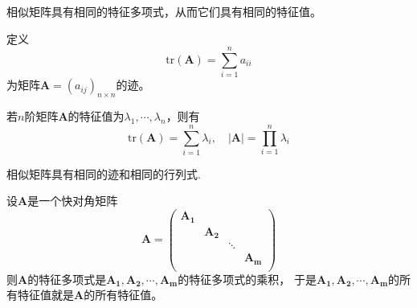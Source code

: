 \begin{theorem}
    相似矩阵具有相同的特征多项式，从而它们具有相同的特征值。
\end{theorem}

\begin{definition}[迹]
    定义$$\mathrm{tr}(\boldsymbol{A})=\sum_{i=1}^n a_{ii}$$
    为矩阵$\boldsymbol{A}=(a_{ij})_{n\times n}$的迹。
\end{definition}

\begin{theorem}
    若$n$阶矩阵$\boldsymbol{A}$的特征值为$\lambda_1,\cdots,\lambda_n$，则有
    $$\mathrm{tr}(\boldsymbol{A})=\sum_{i=1}^n \lambda_i,\quad |\boldsymbol{A}|=\prod_{i=1}^n \lambda_i$$
\end{theorem}

\begin{theorem}
    相似矩阵具有相同的迹和相同的行列式.
\end{theorem}

\begin{theorem}
    设$\boldsymbol{A}$是一个快对角矩阵
    $$\boldsymbol{A}=\left(\begin{array}{cccc}
        \boldsymbol{A_1} & & & \\
         & \boldsymbol{A_2}& & \\
         & & \ddots & \\
         & & & \boldsymbol{A_m}\\
    \end{array}\right)$$
    则$\boldsymbol{A}$的特征多项式是$\boldsymbol{A_1},\boldsymbol{A_2},\cdots,\boldsymbol{A_m}$的特征多项式的乘积，
    于是$\boldsymbol{A_1},\boldsymbol{A_2},\cdots,\boldsymbol{A_m}$的所有特征值就是$\boldsymbol{A}$的所有特征值。
\end{theorem}